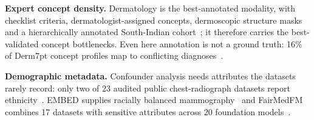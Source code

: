 \textbf{Expert concept density.} Dermatology is the best-annotated modality, with checklist criteria,
dermatologist-assigned concepts, dermoscopic structure masks and a hierarchically annotated South-Indian
cohort~\cite{kawahara2019derm7pt,daneshjou2023skincon,mendonca2013ph2,codella2019isic,madarkar2025dermacon};
it therefore carries the best-validated concept bottlenecks. Even here annotation is not a ground truth:
16\% of Derm7pt concept profiles map to conflicting diagnoses~\cite{napoles2026concept}.

\textbf{Demographic metadata.} Confounder analysis needs attributes the datasets rarely record: only two of
23 audited public chest-radiograph datasets report ethnicity~\cite{yi2022demographic}. EMBED supplies
racially balanced mammography~\cite{jeong2022embed} and FairMedFM combines 17 datasets with sensitive
attributes across 20 foundation models~\cite{jin2024fairmedfm}.


